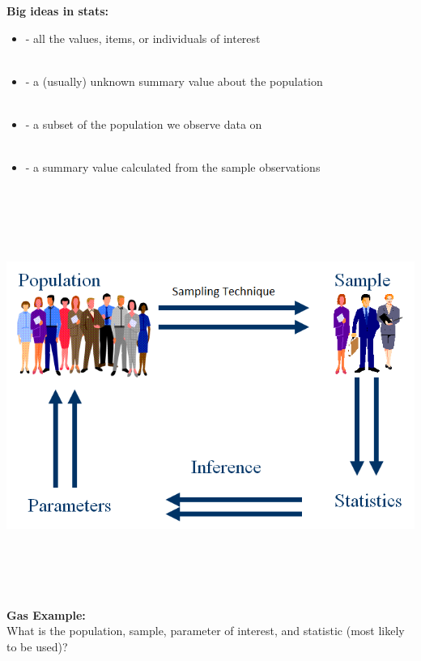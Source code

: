 \newpage

\textbf{Big ideas in stats:}\\
\begin{itemize}
\item \underbar{~~~~~~~~~~~~~~~~~~~~~~~~~~~~~~} - all the values, items, or individuals of interest\\~\\

\item \underbar{~~~~~~~~~~~~~~~~~~~~~~~~~~~~~~}  - a (usually) unknown summary value about the population\\~\\

\item \underbar{~~~~~~~~~~~~~~~~~~~~~~~~~~~~~~} - a subset of the population we observe data on\\~\\

\item \underbar{~~~~~~~~~~~~~~~~~~~~~~~~~~~~~~} - a summary value calculated from the sample observations
\end{itemize}
~\\~\\~\\~\\
\begin{center}
\includegraphics[scale=0.55]{paradigm}
\end{center}
~\\~\\~\\~\\
\textbf{Gas Example:}\\
What is the population, sample, parameter of interest, and statistic (most likely to be used)? 

